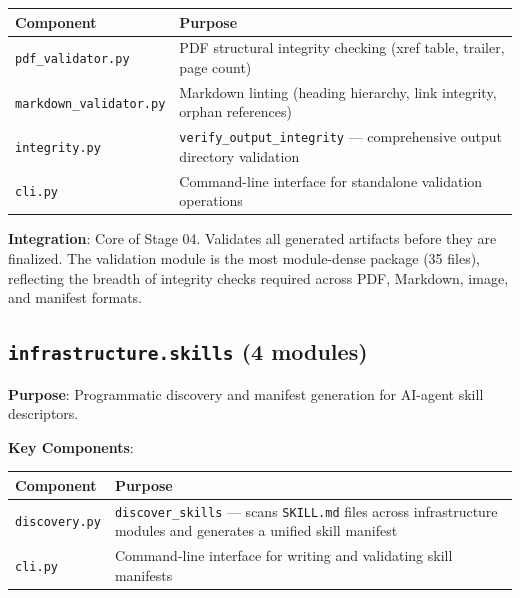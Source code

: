 \documentclass[
]{article}
\newcounter{none} %
\begin{document}
{\def\LTcaptype{none} %
\begin{longtable}[]{@{}
  >{\raggedright\arraybackslash}p{}
  >{\raggedright\arraybackslash}p{}@{}}
\toprule\noalign{}
\begin{minipage}[b]{\linewidth}\raggedright
Component
\end{minipage} & \begin{minipage}[b]{\linewidth}\raggedright
Purpose
\end{minipage} \\
\midrule\noalign{}
\endhead
\bottomrule\noalign{}
\endlastfoot
\texttt{pdf\_validator.py} & PDF structural integrity checking (xref
table, trailer, page count) \\
\texttt{markdown\_validator.py} & Markdown linting (heading hierarchy,
link integrity, orphan references) \\
\texttt{integrity.py} & \texttt{verify\_output\_integrity} ---
comprehensive output directory validation \\
\texttt{cli.py} & Command-line interface for standalone validation
operations \\
\end{longtable}
}

\textbf{Integration}: Core of Stage 04. Validates all generated
artifacts before they are finalized. The validation module is the most
module-dense package (35 files), reflecting the breadth of integrity
checks required across PDF, Markdown, image, and manifest formats.

\subsection{\texorpdfstring{\texttt{infrastructure.skills} (4
modules)}{infrastructure.skills (4 modules)}}\label{infrastructure.skills-4-modules}

\textbf{Purpose}: Programmatic discovery and manifest generation for
AI-agent skill descriptors.

\textbf{Key Components}:

{\def\LTcaptype{none} %
\begin{longtable}[]{@{}
  >{\raggedright\arraybackslash}p{}
  >{\raggedright\arraybackslash}p{}@{}}
\toprule\noalign{}
\begin{minipage}[b]{\linewidth}\raggedright
Component
\end{minipage} & \begin{minipage}[b]{\linewidth}\raggedright
Purpose
\end{minipage} \\
\midrule\noalign{}
\endhead
\bottomrule\noalign{}
\endlastfoot
\texttt{discovery.py} & \texttt{discover\_skills} --- scans
\texttt{SKILL.md} files across infrastructure modules and generates a
unified skill manifest \\
\texttt{cli.py} & Command-line interface for writing and validating
skill manifests \\
\end{longtable}
}
\end{document}
